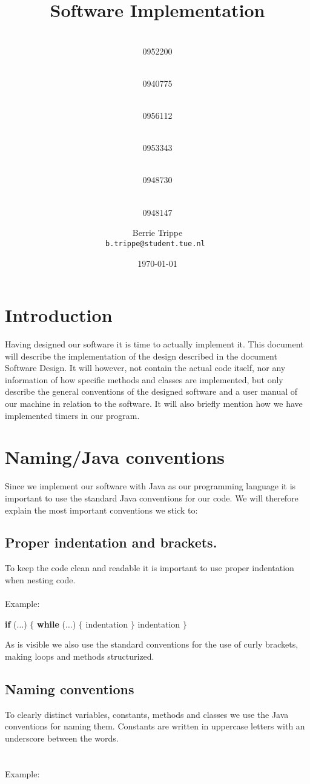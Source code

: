\documentclass[a4paper,oneside,11pt]{article}
\title{\vspace{-\baselineskip}\sffamily\bfseries Software Implementation}
\author{
	\makebox[.25\linewidth]{Sergio van Amerongen}\\0952200 \and
	\makebox[.25\linewidth]{Stefan Cloudt}\\0940775 \and
	\makebox[.25\linewidth]{Daan de Graaf}\\0956112 \and
	\makebox[.25\linewidth]{Robert van Lente}\\0953343 \and
	\makebox[.25\linewidth]{Tom Peters}\\0948730 \and
	\makebox[.25\linewidth]{Berrie Trippe}\\0948147 
	\and \makebox[.75\linewidth]{\textbf{Responsible:}} \and
	Berrie Trippe\\ \tt{b.trippe@student.tue.nl}
}
\date{\today}
\begin{document}
\maketitle
\section{Introduction}
Having designed our software it is time to actually implement it. This document will describe the implementation of the design described in the document Software Design. It will however, not contain the actual code itself, nor any information of how specific methods and classes are implemented, but only describe the general conventions of the designed software and a user manual of our machine in relation to the software. It will also briefly mention how we have implemented timers in our program.

\section{Naming/Java conventions}
Since we implement our software with Java as our programming language it is important to use the standard Java conventions for our code. We will therefore explain the most important conventions we stick to:

\subsection{Proper indentation and brackets.}
To keep the code clean and readable it is important to use proper indentation when nesting code.\\\\
Example:

\begin{algorithmic}
\State \textbf{if} ($\ldots$) $\{$
\State \qquad \textbf{while} ($\ldots$) $\{$
\State \qquad \qquad indentation
\State \qquad $\}$
\State \qquad indentation
\State $\}$
\State
\end{algorithmic}
As is visible we also use the standard conventions for the use of curly brackets, making loops and methods structurized.

\subsection{Naming conventions}
To clearly distinct variables, constants, methods and classes we use the Java conventions for naming them. Constants are written in uppercase letters with an underscore between the words.\\\\\\
Example:
\end{document}
